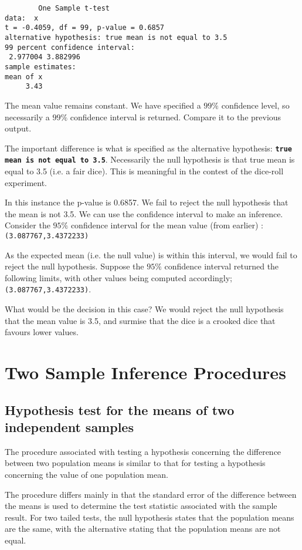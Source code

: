 \begin{verbatim}
        One Sample t-test
data:  x
t = -0.4059, df = 99, p-value = 0.6857
alternative hypothesis: true mean is not equal to 3.5
99 percent confidence interval:
 2.977004 3.882996
sample estimates:
mean of x
     3.43
\end{verbatim}
The mean value remains constant. We have specified a $99\%$ confidence level, so necessarily a $99\%$ confidence interval is returned. Compare it to the previous output.

The important difference is what is specified as the alternative hypothesis: \textbf{\texttt{true mean is not equal to 3.5}}. Necessarily the null hypothesis is that true mean is equal to 3.5 (i.e. a fair dice). This is meaningful in the contest of the dice-roll experiment.

In this instance the p-value is 0.6857. We fail to reject the null hypothesis that the mean is not 3.5.
We can use the confidence interval to make an inference. Consider the $95\%$ confidence interval for the mean value (from earlier) : \texttt{(3.087767,3.4372233)}

As the expected mean (i.e. the null value) is within this interval, we would fail to reject the null hypothesis.
Suppose the $95\%$ confidence interval returned the following limits, with other values being computed accordingly; \texttt{(3.087767,3.4372233)}.

What would be the decision in this case? We would reject the null hypothesis that the mean value is 3.5, and surmise that the dice is a crooked dice that favours lower values.


\newpage
\section{Two Sample Inference Procedures}
\subsection{Hypothesis test for the means of two independent samples}
The procedure associated with testing a hypothesis concerning the difference between two population means is similar to that for testing a hypothesis concerning the value of one population mean.

The procedure differs mainly in that the standard error of the difference between the means is used to determine the test statistic associated with the sample result. For two tailed tests, the null hypothesis states that the population means are the same, with the alternative stating that the population means are not equal.

